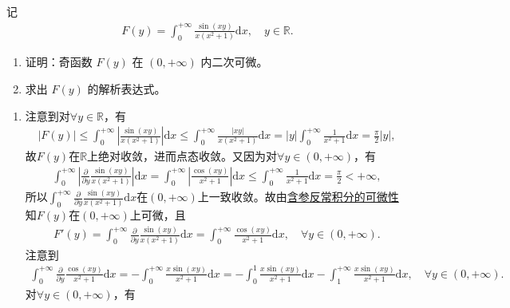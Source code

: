 \documentclass[../../main.tex]{subfiles}%
\begin{document}
\begin{example}
记
\begin{align*}
F(y) = \int_{0}^{+\infty} \frac{\sin(xy)}{x(x^2 + 1)} \mathrm{d}x, \quad y \in \mathbb{R}.
\end{align*}
\begin{enumerate}[(1)]
\item 证明：奇函数 $F(y)$ 在 $(0,+\infty)$ 内二次可微。
\item 求出 $F(y)$ 的解析表达式。
\end{enumerate}
\end{example}
\begin{solution}
\begin{enumerate}[(1)]
\item 注意到对$\forall y\in\mathbb{R}$，有
\begin{align}
|F(y)|\leqslant \int_{0}^{+\infty} \left| \frac{\sin(xy)}{x(x^2+1)} \right| \mathrm{d}x
\leqslant \int_{0}^{+\infty} \frac{|xy|}{x(x^2+1)} \mathrm{d}x
= |y| \int_{0}^{+\infty} \frac{1}{x^2+1} \mathrm{d}x
= \frac{\pi}{2} |y| ,\label{eq::FHJIOWJFIOJJWIO32483UUUII}
\end{align}
故$F(y)$在$\mathbb{R}$上绝对收敛，进而点态收敛。又因为对$\forall y\in(0,+\infty)$，有
\begin{align*}
\int_{0}^{+\infty} \left| \frac{\partial}{\partial y} \frac{\sin(xy)}{x(x^2+1)} \right| \mathrm{d}x
= \int_{0}^{+\infty} \left| \frac{\cos(xy)}{x^2+1} \right| \mathrm{d}x
\leqslant \int_{0}^{+\infty} \frac{1}{x^2+1} \mathrm{d}x
= \frac{\pi}{2} < +\infty,
\end{align*}
所以$\int_{0}^{+\infty} \frac{\partial}{\partial y} \frac{\sin(xy)}{x(x^2+1)} \mathrm{d}x$在$(0,+\infty)$上一致收敛。故由\hyperref[theorem:含参反常积分的可微性]{含参反常积分的可微性}知$F(y)$在$(0,+\infty)$上可微，且
\begin{align}
F'(y) = \int_{0}^{+\infty} \frac{\partial}{\partial y} \frac{\sin(xy)}{x(x^2+1)} \mathrm{d}x
= \int_{0}^{+\infty} \frac{\cos(xy)}{x^2+1} \mathrm{d}x, \quad \forall y\in(0,+\infty).
\label{eq:3122187748IOUFI23--23aaaaa-1}
\end{align}
注意到
\begin{align}
\int_{0}^{+\infty} \frac{\partial}{\partial y} \frac{\cos(xy)}{x^2+1} \mathrm{d}x
= -\int_{0}^{+\infty} \frac{x\sin(xy)}{x^2+1} \mathrm{d}x
= -\int_{0}^{1} \frac{x\sin(xy)}{x^2+1} \mathrm{d}x
- \int_{1}^{+\infty} \frac{x\sin(xy)}{x^2+1} \mathrm{d}x, \quad \forall y\in(0,+\infty).
\label{eq:3122187748IOUFI23--23aaaaa-2}
\end{align}
对$\forall y\in(0,+\infty)$，有

\end{enumerate}
\end{solution}
\end{document}
